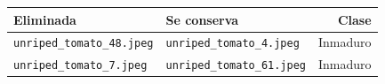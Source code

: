 \small
\begin{tabular}{llr}
\toprule
Eliminada & Se conserva & Clase \\
\midrule
\texttt{unriped\_tomato\_48.jpeg} & \texttt{unriped\_tomato\_4.jpeg} & Inmaduro \\
\texttt{unriped\_tomato\_7.jpeg} & \texttt{unriped\_tomato\_61.jpeg} & Inmaduro \\
\bottomrule
\end{tabular}
